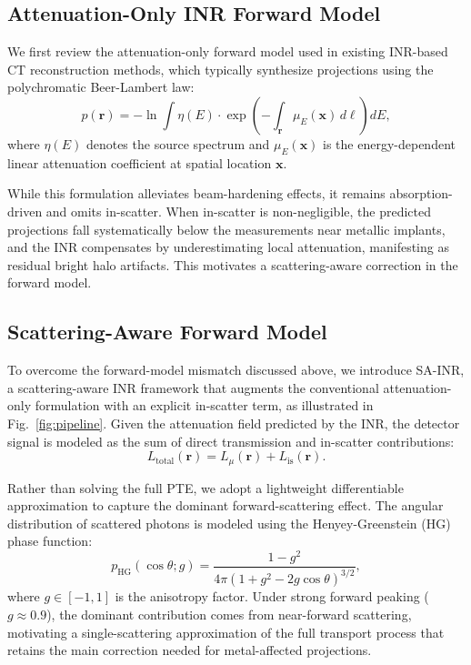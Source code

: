 \documentclass[journal]{IEEEtran}
\newcommand{\vx}{\mathbf{x}}
\newcommand{\vr}{\mathbf{r}}
\def\ourmodel{SA-INR}
\begin{document}
\subsection{Attenuation-Only INR Forward Model}
We first review the attenuation-only forward model used in existing INR-based CT reconstruction methods, which typically synthesize projections using the polychromatic Beer-Lambert law:
\begin{equation}\label{eq:polyner}
 p(\vr) = -\ln \int \eta(E)\cdot \exp\!\left(-\int_{\vr}\mu_E(\vx)\,d\ell\right)dE,
\end{equation}
where $\eta(E)$ denotes the source spectrum and $\mu_E(\vx)$ is the energy-dependent linear attenuation coefficient at spatial location $\vx$.

While this formulation alleviates beam-hardening effects, it remains absorption-driven and omits in-scatter. When in-scatter is non-negligible, the predicted projections fall systematically below the measurements near metallic implants, and the INR compensates by underestimating local attenuation, manifesting as residual bright halo artifacts. This motivates a scattering-aware correction in the forward model.

\subsection{Scattering-Aware Forward Model}
To overcome the forward-model mismatch discussed above, we introduce \ourmodel, a scattering-aware INR framework that augments the conventional attenuation-only formulation with an explicit in-scatter term, as illustrated in Fig.~\ref{fig:pipeline}. 
Given the attenuation field predicted by the INR, the detector signal is modeled as the sum of direct transmission and in-scatter contributions:
\begin{equation}\label{eq:pte}
  L_{\text{total}}(\vr)=L_{\mu}(\vr)+L_{\text{is}}(\vr).
\end{equation}

Rather than solving the full PTE, we adopt a lightweight differentiable approximation to capture the dominant forward-scattering effect. The angular distribution of scattered photons is modeled using the Henyey-Greenstein (HG) phase function:
\begin{equation}\label{eq:hg}
  p_{\text{HG}}(\cos\theta;g)=\frac{1-g^2}{4\pi(1+g^2-2g\cos\theta)^{3/2}},
\end{equation}
where $g\in[-1,1]$ is the anisotropy factor. Under strong forward peaking ($g \approx 0.9$), the dominant contribution comes from near-forward scattering, motivating a single-scattering approximation of the full transport process that retains the main correction needed for metal-affected projections.
\end{document}
